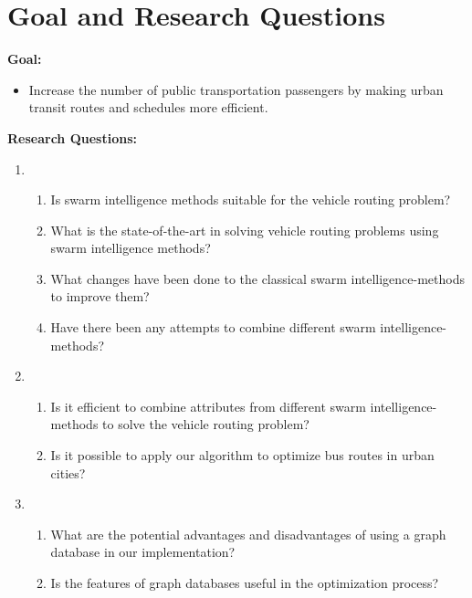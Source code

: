 \section{Goal and Research Questions}
\textbf{Goal:}
\begin{itemize}
\item \label{itm:goal} Increase the number of public transportation passengers by making urban transit routes and schedules more efficient.
\end{itemize}
\textbf{Research Questions:}
\begin{enumerate}[label=\textbf{\arabic*})]
\item 
    \begin{enumerate}
    \item \label{itm:1a} Is swarm intelligence methods suitable for the vehicle routing problem?
    \item \label{itm:1b} What is the state-of-the-art in solving vehicle routing problems using swarm intelligence methods?
    \item \label{itm:1c} What changes have been done to the classical swarm intelligence-methods to improve them?
    \item \label{itm:1d} Have there been any attempts to combine different swarm intelligence-methods?
	\end{enumerate}
\item
    \begin{enumerate}
    \item \label{itm:2a} Is it efficient to combine attributes from different swarm intelligence-methods to solve the vehicle routing problem?
    \item \label{itm:2b} Is it possible to apply our algorithm to optimize bus routes in urban cities?
    \end{enumerate}

\item
	\begin{enumerate}
	\item \label{itm:3a} What are the potential advantages and disadvantages of using a graph database in our implementation?
	\item \label{itm:3b} Is the features of graph databases useful in the optimization process? 
    \end{enumerate}
\end{enumerate}